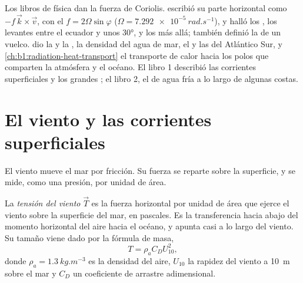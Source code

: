 \begin{recall}
Los libros de física dan la fuerza de Coriolis. 
escribió su parte horizontal como $-f\,\vec k\times\vec v$, con el 
$f = 2\Omega\sin\varphi$ ($\Omega = \qty{7.292e-5}{rad.s^{-1}}$), y halló los , los levantes entre el ecuador y unos \ang{30}, y los  más allá; también definió la  de un vuelco.
 dio la  y la , la densidad del agua de mar, el  y las  del Atlántico Sur, y \cref{ch:b1:radiation-heat-transport} el transporte de calor hacia los polos que comparten la atmósfera y el océano. El libro 1 describió las corrientes superficiales y los grandes ; el libro 2, el  de agua fría a lo largo de algunas costas.
\end{recall}

\section{El viento y las corrientes superficiales}\label{sec:b1:ocean-circulation:wind}

El viento mueve el mar por fricción. Su fuerza se reparte sobre la superficie, y se mide, como una presión, por unidad de área.

\begin{definition}\label{def:b1:ocean-circulation:wind-stress}
La \emph{tensión del viento} $\vec T$ es la fuerza horizontal por unidad de área que ejerce el viento sobre la superficie del mar, en pascales. Es la transferencia hacia abajo del momento horizontal del aire hacia el océano, y apunta casi a lo largo del viento. Su tamaño viene dado por la fórmula de masa,
\[
  T = \rho_a C_D U_{10}^2,
\]
donde $\rho_a = \qty{1.3}{kg.m^{-3}}$ es la densidad del aire, $U_{10}$ la rapidez del viento a \qty{10}{m} sobre el mar y $C_D$ un coeficiente de arrastre adimensional.
\end{definition}

